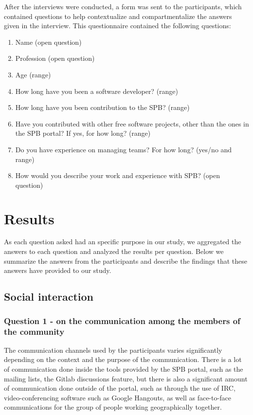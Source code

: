 \documentclass{sigchi}
\begin{document}
After the interviews were conducted, a form was sent to the participants, which contained questions to help contextualize and compartmentalize the answers given in the interview. This questionnaire contained the following questions:

\begin{enumerate}
  \item Name (open question)
  \item Profession (open question)
  \item Age (range)
  \item How long have you been a software developer? (range)
  \item How long have you been contribution to the SPB? (range)
  \item Have you contributed with other free software projects, other than the ones in the SPB portal? If yes, for how long? (range)
  \item Do you have experience on managing teams? For how long? (yes/no and range)
  \item How would you describe your work and experience with SPB? (open question) 
\end{enumerate}


%
%
%
%
\section{Results}

As each question asked had an specific purpose in our study, we aggregated the answers to each question and analyzed the results per question. Below we summarize the answers from the participants and describe the findings that these answers have provided to our study.

\subsection{Social interaction}

\subsubsection{Question 1 - on the communication among the members of the community}
The communication channels used by the participants varies significantly depending on the context and the purpose of the communication. There is a lot of communication done inside the tools provided by the SPB portal, such as the mailing lists, the Gitlab discussions feature, but there is also a significant amount of communication done outside of the portal, such as through the use of IRC, video-conferencing software such as Google Hangouts, as well as face-to-face communications for the group of people working geographically together.
\end{document}
